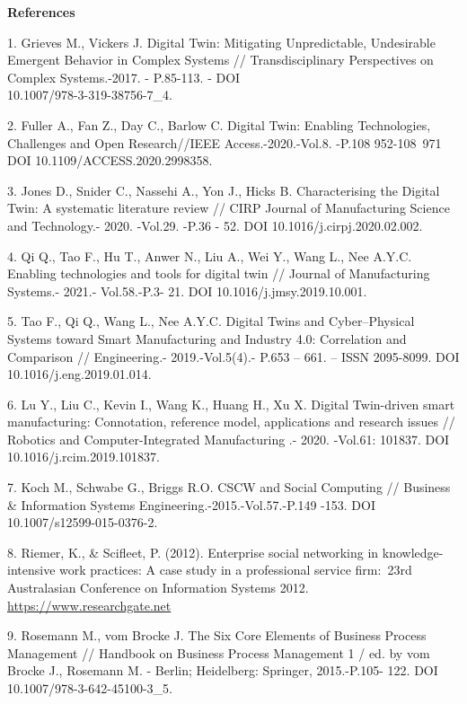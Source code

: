 \begin{center}
{\bfseries References}
\end{center}

\begin{refs}
1. Grieves M., Vickers J. Digital Twin: Mitigating Unpredictable,
Undesirable Emergent Behavior in Complex Systems // Transdisciplinary
Perspectives on Complex Systems.-2017. - P.85-113. - DOI\\
10.1007/978-3-319-38756-7\_4.

2. Fuller A., Fan Z., Day C., Barlow C. Digital Twin: Enabling
Technologies, Challenges and Open Research//IEEE Access.-2020.-Vol.8.
-P.108 952-108~971 DOI 10.1109/ACCESS.2020.2998358.

3. Jones D., Snider C., Nassehi A., Yon J., Hicks B. Characterising the
Digital Twin: A systematic literature review // CIRP Journal of
Manufacturing Science and Technology.- 2020. -Vol.29. -P.36 - 52. DOI
10.1016/j.cirpj.2020.02.002.

4. Qi Q., Tao F., Hu T., Anwer N., Liu A., Wei Y., Wang L., Nee A.Y.C.
Enabling technologies and tools for digital twin // Journal of
Manufacturing Systems.- 2021.- Vol.58.-P.3- 21.
DOI 10.1016/j.jmsy.2019.10.001.

5. Tao F., Qi Q., Wang L., Nee A.Y.C. Digital Twins and Cyber--Physical
Systems toward Smart Manufac\-turing and Industry 4.0: Correlation and
Comparison // Engineering.- 2019.-Vol.5(4).- P.653 -- 661. -- ISSN
2095-8099. DOI 10.1016/j.eng.2019.01.014.

6. Lu Y., Liu C., Kevin I., Wang K., Huang H., Xu X. Digital Twin-driven
smart manufacturing: Connotat\-ion, reference model, applications and
research issues // Robotics and Computer-Integrated Manufacturing .-
2020. -Vol.61: 101837. DOI 10.1016/j.rcim.2019.101837.

7. Koch M., Schwabe G., Briggs R.O. CSCW and Social Computing // Business
\& Information Systems Engineering.-2015.-Vol.57.-P.149 -153. DOI
10.1007/s12599-015-0376-2.

8. Riemer, K., \& Scifleet, P. (2012). Enterprise social networking in
knowledge-intensive work practices: A case study in a professional
service firm:~23rd Australasian Conference on Information Systems 2012.
\href{https://www.researchgate.net/publication/257821264_Enterprise_social_networking_in_knowledge-intensive_work_practices_A_case_study_in _intensive_ work_ practices_A_case_study_in_a_professional_service_firm}{https://www.researchgate.net}

9. Rosemann M., vom Brocke J. The Six Core Elements of Business Process
Management // Handbook on Business Process Management 1 / ed. by vom
Brocke J., Rosemann M. - Berlin; Heidelberg: Springer, 2015.-P.105-
122. DOI 10.1007/978-3-642-45100-3\_5.


\end{refs}

